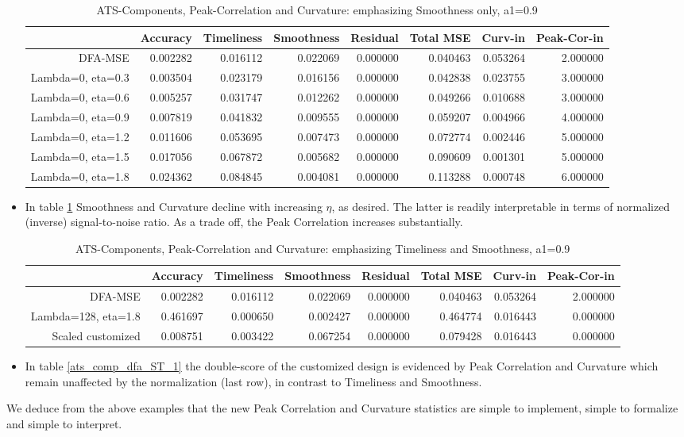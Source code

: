 \documentclass[a4paper]{book}
\begin{document}
\begin{itemize}
\begin{table}[ht]
\centering
\begin{tabular}{rrrrrrrr}
  \hline
 & Accuracy & Timeliness & Smoothness & Residual & Total MSE & Curv-in & Peak-Cor-in \\ 
  \hline
DFA-MSE & 0.002282 & 0.016112 & 0.022069 & 0.000000 & 0.040463 & 0.053264 & 2.000000 \\ 
  Lambda=0, eta=0.3 & 0.003504 & 0.023179 & 0.016156 & 0.000000 & 0.042838 & 0.023755 & 3.000000 \\ 
  Lambda=0, eta=0.6 & 0.005257 & 0.031747 & 0.012262 & 0.000000 & 0.049266 & 0.010688 & 3.000000 \\ 
  Lambda=0, eta=0.9 & 0.007819 & 0.041832 & 0.009555 & 0.000000 & 0.059207 & 0.004966 & 4.000000 \\ 
  Lambda=0, eta=1.2 & 0.011606 & 0.053695 & 0.007473 & 0.000000 & 0.072774 & 0.002446 & 5.000000 \\ 
  Lambda=0, eta=1.5 & 0.017056 & 0.067872 & 0.005682 & 0.000000 & 0.090609 & 0.001301 & 5.000000 \\ 
  Lambda=0, eta=1.8 & 0.024362 & 0.084845 & 0.004081 & 0.000000 & 0.113288 & 0.000748 & 6.000000 \\ 
   \hline
\end{tabular}
\caption{ATS-Components, Peak-Correlation and Curvature: emphasizing Smoothness only, a1=0.9} 
\label{ats_comp_dfa_S_1_pc}
\end{table}\item In table \ref{ats_comp_dfa_S_1_pc} Smoothness and Curvature decline with increasing $\eta$, as desired. The latter is readily interpretable in terms of normalized (inverse) signal-to-noise ratio. As a trade off, the Peak Correlation increases substantially. 
\begin{table}[ht]
\centering
\begin{tabular}{rrrrrrrr}
  \hline
 & Accuracy & Timeliness & Smoothness & Residual & Total MSE & Curv-in & Peak-Cor-in \\ 
  \hline
DFA-MSE & 0.002282 & 0.016112 & 0.022069 & 0.000000 & 0.040463 & 0.053264 & 2.000000 \\ 
  Lambda=128, eta=1.8 & 0.461697 & 0.000650 & 0.002427 & 0.000000 & 0.464774 & 0.016443 & 0.000000 \\ 
  Scaled customized & 0.008751 & 0.003422 & 0.067254 & 0.000000 & 0.079428 & 0.016443 & 0.000000 \\ 
   \hline
\end{tabular}
\caption{ATS-Components, Peak-Correlation and Curvature: emphasizing Timeliness and Smoothness, a1=0.9} 
\label{ats_comp_dfa_ST_1_pc}
\end{table}\item In table \ref{ats_comp_dfa_ST_1} the double-score of the customized design is evidenced by Peak Correlation and Curvature which remain unaffected by the normalization (last row), in contrast to Timeliness and Smoothness.      
\end{itemize}
We deduce from the above examples that the new Peak Correlation and Curvature statistics are simple to implement, simple to formalize and simple to interpret.
\end{document}
